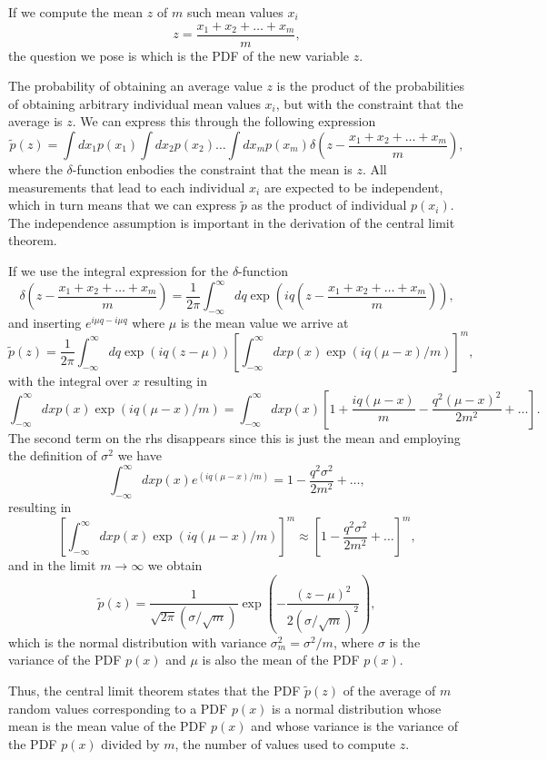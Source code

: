If we compute the mean $z$ of $m$ such mean values $x_i$   
\[
   z=\frac{x_1+x_2+\dots+x_m}{m},
\]
the question we pose is which is the PDF of the new variable $z$.

The probability of obtaining an average value $z$ is the product of the 
probabilities of obtaining arbitrary individual mean values $x_i$,
but with the constraint that the average is $z$. We can express this through
the following expression
\[
    \tilde{p}(z)=\int dx_1p(x_1)\int dx_2p(x_2)\dots\int dx_mp(x_m)
    \delta(z-\frac{x_1+x_2+\dots+x_m}{m}),
\]
where the $\delta$-function enbodies the constraint that the mean is $z$.
All measurements that lead to each individual $x_i$ are expected to
be independent, which in turn means that we can express $\tilde{p}$ as the 
product of individual $p(x_i)$.  The independence assumption is important in the derivation of the central limit theorem.

If we use the integral expression for the $\delta$-function
\[
   \delta(z-\frac{x_1+x_2+\dots+x_m}{m})=\frac{1}{2\pi}\int_{-\infty}^{\infty}
   dq\exp{\left(iq(z-\frac{x_1+x_2+\dots+x_m}{m})\right)},
\]
and inserting $e^{i\mu q-i\mu q}$ where $\mu$ is the mean value
we arrive at
\[
   \tilde{p}(z)=\frac{1}{2\pi}\int_{-\infty}^{\infty}
   dq\exp{\left(iq(z-\mu)\right)}\left[\int_{-\infty}^{\infty}
   dxp(x)\exp{\left(iq(\mu-x)/m\right)}\right]^m,
\]
with the integral over $x$ resulting in
\[
  \int_{-\infty}^{\infty}dxp(x)\exp{\left(iq(\mu-x)/m\right)}=
  \int_{-\infty}^{\infty}dxp(x)
   \left[1+\frac{iq(\mu-x)}{m}-\frac{q^2(\mu-x)^2}{2m^2}+\dots\right].
\]
The second term on the rhs disappears since this is just the mean and 
employing the definition of $\sigma^2$ we have 
\[
  \int_{-\infty}^{\infty}dxp(x)e^{\left(iq(\mu-x)/m\right)}=
  1-\frac{q^2\sigma^2}{2m^2}+\dots,
\]
resulting in 
\[
  \left[\int_{-\infty}^{\infty}dxp(x)\exp{\left(iq(\mu-x)/m\right)}\right]^m\approx
  \left[1-\frac{q^2\sigma^2}{2m^2}+\dots \right]^m,
\]
and in the limit $m\rightarrow \infty$ we obtain 
\[
   \tilde{p}(z)=\frac{1}{\sqrt{2\pi}(\sigma/\sqrt{m})}
    \exp{\left(-\frac{(z-\mu)^2}{2(\sigma/\sqrt{m})^2}\right)},
\]
which is the normal distribution with variance
$\sigma^2_m=\sigma^2/m$, where $\sigma$ is the variance of the PDF $p(x)$
and $\mu$ is also the mean of the PDF $p(x)$. 

Thus, the central limit theorem states that the PDF $\tilde{p}(z)$ of
the average of $m$ random values corresponding to a PDF $p(x)$ 
is a normal distribution whose mean is the 
mean value of the PDF $p(x)$ and whose variance is the variance
of the PDF $p(x)$ divided by $m$, the number of values used to compute $z$.

